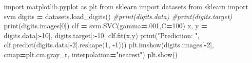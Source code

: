 \documentclass[]{book}
\newenvironment{Shaded}{\begin{snugshade}}{\end{snugshade}}
\newcommand{\DecValTok}[1]{\textcolor[rgb]{0.00,0.00,0.81}{#1}}
\newcommand{\StringTok}[1]{\textcolor[rgb]{0.31,0.60,0.02}{#1}}
\newcommand{\ImportTok}[1]{#1}
\newcommand{\CommentTok}[1]{\textcolor[rgb]{0.56,0.35,0.01}{\textit{#1}}}
\newcommand{\OperatorTok}[1]{\textcolor[rgb]{0.81,0.36,0.00}{\textbf{#1}}}
\newcommand{\BuiltInTok}[1]{#1}
\newcommand{\NormalTok}[1]{#1}
\begin{document}
\begin{Shaded}
\begin{Highlighting}[]
\ImportTok{import}\NormalTok{ matplotlib.pyplot }\ImportTok{as}\NormalTok{ plt}
\ImportTok{from}\NormalTok{ sklearn }\ImportTok{import}\NormalTok{ datasets}
\ImportTok{from}\NormalTok{ sklearn }\ImportTok{import}\NormalTok{ svm}
\NormalTok{digits }\OperatorTok{=}\NormalTok{ datasets.load_digits()}
\CommentTok{#print(digits.data)}
\CommentTok{#print(digits.target)}
\BuiltInTok{print}\NormalTok{(digits.images[}\DecValTok{0}\NormalTok{])}
\NormalTok{clf }\OperatorTok{=}\NormalTok{ svm.SVC(gamma}\OperatorTok{=}\NormalTok{.}\DecValTok{001}\NormalTok{,C}\OperatorTok{=}\DecValTok{100}\NormalTok{)}
\NormalTok{x, y }\OperatorTok{=}\NormalTok{ digits.data[:}\OperatorTok{-}\DecValTok{10}\NormalTok{], digits.target[:}\OperatorTok{-}\DecValTok{10}\NormalTok{]}
\NormalTok{clf.fit(x,y)}
\BuiltInTok{print}\NormalTok{(}\StringTok{"Prediction: "}\NormalTok{, clf.predict(digits.data[}\OperatorTok{-}\DecValTok{2}\NormalTok{].reshape(}\DecValTok{1}\NormalTok{, }\OperatorTok{-}\DecValTok{1}\NormalTok{)))}
\NormalTok{plt.imshow(digits.images[}\OperatorTok{-}\DecValTok{2}\NormalTok{], cmap}\OperatorTok{=}\NormalTok{plt.cm.gray_r, interpolation}\OperatorTok{=}\StringTok{"nearest"}\NormalTok{)}
\NormalTok{plt.show()}
\end{Highlighting}
\end{Shaded}


\end{document}
